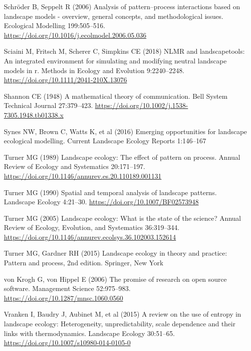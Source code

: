 \documentclass[
  12pt,
  a4paperpaper,
]{article}
\newlength{\cslhangindent}
\newenvironment{CSLReferences}[2] %
 {\begin{list}{}{%
  \setlength{\itemindent}{0pt}
  \setlength{\leftmargin}{0pt}
  \setlength{\parsep}{0pt}
  \ifodd #1
   \setlength{\leftmargin}{\cslhangindent}
   \setlength{\itemindent}{-1\cslhangindent}
  \fi
  \setlength{\itemsep}{#2\baselineskip}}}
 {\end{list}}
\begin{document}
\begin{CSLReferences}{1}{1}
Schröder B, Seppelt R (2006) Analysis of pattern--process interactions
based on landscape models - overview, general concepts, and
methodological issues. Ecological Modelling 199:505--516.
\url{https://doi.org/10.1016/j.ecolmodel.2006.05.036}

Sciaini M, Fritsch M, Scherer C, Simpkins CE (2018) NLMR and
landscapetools: An integrated environment for simulating and modifying
neutral landscape models in r. Methods in Ecology and Evolution
9:2240--2248. \url{https://doi.org/10.1111/2041-210X.13076}

Shannon CE (1948) A mathematical theory of communication. Bell System
Technical Journal 27:379--423.
\url{https://doi.org/10.1002/j.1538-7305.1948.tb01338.x}

Synes NW, Brown C, Watts K, et al (2016) Emerging opportunities for
landscape ecological modelling. Current Landscape Ecology Reports
1:146--167

Turner MG (1989) Landscape ecology: The effect of pattern on process.
Annual Review of Ecology and Systematics 20:171--197.
\url{https://doi.org/10.1146/annurev.es.20.110189.001131}

Turner MG (1990) Spatial and temporal analysis of landscape patterns.
Landscape Ecology 4:21--30. \url{https://doi.org/10.1007/BF02573948}

Turner MG (2005) Landscape ecology: What is the state of the science?
Annual Review of Ecology, Evolution, and Systematics 36:319--344.
\url{https://doi.org/10.1146/annurev.ecolsys.36.102003.152614}

Turner MG, Gardner RH (2015) Landscape ecology in theory and practice:
Pattern and process, 2nd edition. Springer, New York

von Krogh G, von Hippel E (2006) The promise of research on open source
software. Management Science 52:975--983.
\url{https://doi.org/10.1287/mnsc.1060.0560}

Vranken I, Baudry J, Aubinet M, et al (2015) A review on the use of
entropy in landscape ecology: Heterogeneity, unpredictability, scale
dependence and their links with thermodynamics. Landscape Ecology
30:51--65. \url{https://doi.org/10.1007/s10980-014-0105-0}


\end{CSLReferences}
\end{document}
